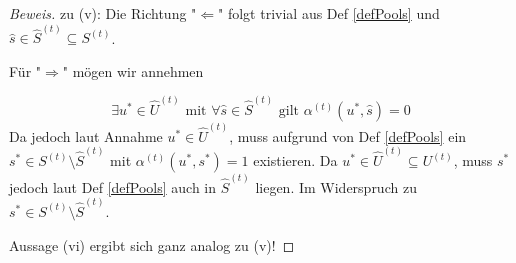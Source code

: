 \begin{proof}[Beweis]
zu (v): Die Richtung "$\Leftarrow$" folgt trivial aus Def \ref{defPools} und $\widehat{s} \in \widehat{S}^{(t)} \subseteq {S}^{(t)}$.

Für "$\Rightarrow$" mögen wir annehmen 

\begin{equation*}
  \exists u^{*} \in \widehat{U}^{(t)} \textrm{ mit } \forall \widehat{s} \in \widehat{S}^{(t)} \textrm{ gilt } \alpha^{(t)}(u^{*}, \widehat{s}) = 0
\end{equation*}
Da jedoch laut Annahme $u^{*} \in \widehat{U}^{(t)}$, muss aufgrund von Def \ref{defPools} ein $s^{*} \in S^{(t)} \setminus \widehat{S}^{(t)}$ mit $\alpha^{(t)}(u^{*}, s^{*}) = 1$ existieren. Da $u^{*} \in \widehat{U}^{(t)} \subseteq {U}^{(t)}$, muss $s^{*}$ jedoch laut Def \ref{defPools} auch in $\widehat{S}^{(t)}$ liegen. Im Widerspruch zu $s^{*} \in S^{(t)} \setminus \widehat{S}^{(t)}$.

\vspace{0.3cm}

Aussage (vi) ergibt sich ganz analog zu (v)!
  
\end{proof}
\vspace{0.3cm}

